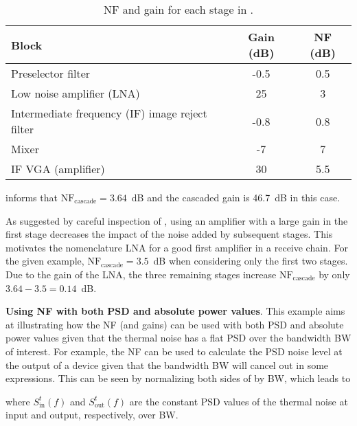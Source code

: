 \begin{table}
\centering
\caption{NF and gain for each stage in .\label{tab:noiseFigureReceiver}}
\begin{tabular}{|l|c|c|}
\hline
Block & Gain (dB) & NF (dB) \\ \hline \hline
Preselector filter & -0.5 & 0.5 \\ \hline
Low noise amplifier (LNA) & 25 & 3 \\ \hline
Intermediate frequency (IF) image reject filter & -0.8 & 0.8 \\ \hline
Mixer & -7 & 7 \\ \hline
IF VGA (amplifier) & 30 & 5.5 \\ \hline
\end{tabular}
\end{table}



 informs that $\textrm{NF}_{\textrm{cascade}}=3.64$~dB and the cascaded gain is 46.7~dB in this case.

As suggested by careful inspection of , using an amplifier with a large gain in the first stage decreases the impact of the noise added by subsequent stages. This motivates the nomenclature LNA for a good first amplifier in a receive chain. For the given example, $\textrm{NF}_{\textrm{cascade}}=3.5$~dB when considering only the first two stages. Due to the gain of the LNA, the three remaining stages increase $\textrm{NF}_{\textrm{cascade}}$ by only $3.64-3.5=0.14$~dB.
\eExample

\bExample \textbf{Using NF with both PSD and absolute power values}.
\label{ex:nfWithPSD}
This example aims at illustrating how the NF (and gains) can be used with both PSD and absolute power values given that the thermal noise has a flat PSD over the bandwidth BW of interest. 
For example, the NF can be used to calculate the PSD noise level at the output of a device given that the bandwidth BW will cancel out in some expressions.
This can be seen by normalizing both sides of  by BW, which leads to

where $S_{\textrm{in}}^{t}(f)$ and $S_{\textrm{out}}^{t}(f)$ are the constant PSD values of the thermal noise at input and output, respectively, over BW.

